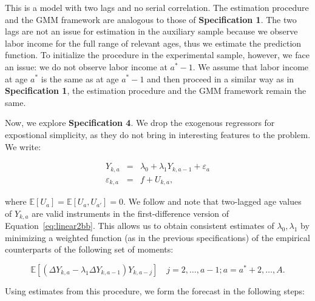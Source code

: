 \noindent This is a model with two lags and no serial correlation. The estimation procedure and the GMM framework are analogous to those of \textbf{Specification 1}. The two lags are not an issue for estimation in the auxiliary sample because we observe labor income for the full range of relevant ages, thus we estimate the prediction function. To initialize the procedure in the experimental sample, however, we face an issue: we do not observe labor income at $a^* - 1$. We assume that labor income at age $a^*$ is the same as at age $a^* - 1$ and then proceed in a similar way as in \textbf{Specification 1}, the estimation procedure and the GMM framework remain the same.

\noindent Now, we explore \textbf{Specification 4}. We drop the exogenous regressors for expostional simplicity, as they do not bring in interesting features to the problem. We write:

\begin{eqnarray}
Y_{k,a} &=& \lambda_{0} + \lambda_{1} Y_{k,a-1} + \varepsilon_{a} \label{eq:linear1bb} \\
\varepsilon_{k,a} &=& f + U_{k,a}, \label{eq:linear2bb}
\end{eqnarray}

\noindent where $\mathbb{E}[U_{a}] = \mathbb{E}[U_{a}, U_{a'}] = 0$. We follow \citet{Arellano_1991_Some-Tests} and note that two-lagged age values of $Y_{k,a}$ are valid instruments in the first-difference version of Equation~\eqref{eq:linear2bb}. This allows us to obtain consistent estimates of $\lambda_{0}, \lambda_{1}$ by minimizing a weighted function (as in the previous specifications) of the empirical counterparts of the following set of moments:

\begin{equation}
\mathbb{E} \left[ \left( \Delta Y_{k,a} -  \lambda_{1} \Delta Y_{k,a-1} \right)   Y_{k,a - j} \right] \quad j = 2, \ldots, a - 1; a = a^*+ 2, \ldots, A. \label{eq:abmoment}
\end{equation}

\noindent Using estimates from this procedure, we form the forecast in the following steps:

